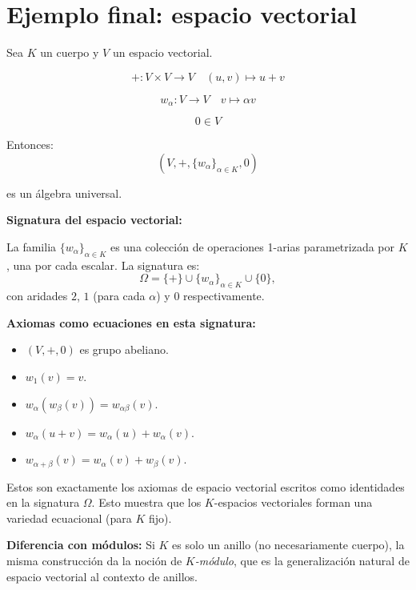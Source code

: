 \documentclass[12pt]{article}
\begin{document}
\section*{Ejemplo final: espacio vectorial}

Sea $K$ un cuerpo y $V$ un espacio vectorial.

\[
+:V\times V\to V
\quad (u,v)\mapsto u+v
\]

\[
w_\alpha:V\to V
\quad v\mapsto \alpha v
\]

\[
0\in V
\]

Entonces:
\[
(V,+,\{w_\alpha\}_{\alpha\in K},0)
\]

es un álgebra universal.

\begin{tcolorbox}[iabox]
\textbf{Signatura del espacio vectorial:}

La familia $\{w_\alpha\}_{\alpha\in K}$ es una colección de operaciones 1-arias parametrizada por $K$, una por cada escalar. La signatura es:
\[
  \Omega = \{+\} \cup \{w_\alpha\}_{\alpha\in K} \cup \{0\},
\]
con aridades $2$, $1$ (para cada $\alpha$) y $0$ respectivamente.

\textbf{Axiomas como ecuaciones en esta signatura:}
\begin{itemize}
  \item $(V,+,0)$ es grupo abeliano.
  \item $w_1(v)=v$.
  \item $w_\alpha(w_\beta(v))=w_{\alpha\beta}(v)$.
  \item $w_\alpha(u+v)=w_\alpha(u)+w_\alpha(v)$.
  \item $w_{\alpha+\beta}(v)=w_\alpha(v)+w_\beta(v)$.
\end{itemize}
Estos son exactamente los axiomas de espacio vectorial escritos como identidades en la signatura $\Omega$. Esto muestra que los $K$-espacios vectoriales forman una variedad ecuacional (para $K$ fijo).

\medskip
\textbf{Diferencia con módulos:} Si $K$ es solo un anillo (no necesariamente cuerpo), la misma construcción da la noción de \emph{$K$-módulo}, que es la generalización natural de espacio vectorial al contexto de anillos.
\end{tcolorbox}
\end{document}
